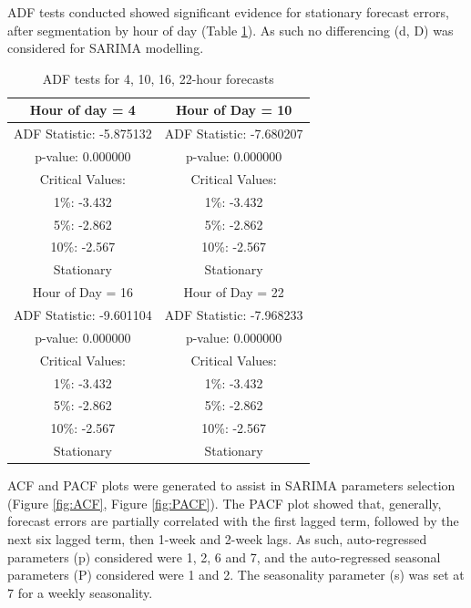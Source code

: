 \documentclass[mstat,12pt]{unswthesis}
\begin{document}
ADF tests conducted showed significant evidence for stationary forecast errors, after segmentation by hour of day (Table \ref{tab:tab6}). As such no differencing (d, D) was considered for SARIMA modelling.

\begin{table}[H]
\caption{ADF tests for 4, 10, 16, 22-hour forecasts}
\centering
\begin{tabular}{||c||c||}
\hline
Hour of day = 4 & Hour of Day = 10 \\
\hline
ADF Statistic: -5.875132 & ADF Statistic: -7.680207 \\
p-value: 0.000000 & p-value: 0.000000 \\
Critical Values: & Critical Values: \\
 1\%: -3.432  &  1\%: -3.432 \\
 5\%: -2.862 &   5\%: -2.862 \\
 10\%: -2.567 &  10\%: -2.567 \\
Stationary & Stationary \\
\hline
\hline
Hour of Day = 16 & Hour of Day = 22 \\
\hline
ADF Statistic: -9.601104 & ADF Statistic: -7.968233 \\
p-value: 0.000000 & p-value: 0.000000 \\
Critical Values: & Critical Values: \\
 1\%: -3.432 &  1\%: -3.432 \\
 5\%: -2.862 &  5\%: -2.862 \\
 10\%: -2.567 &  10\%: -2.567 \\
Stationary & Stationary \\
\hline
\end{tabular}
\label{tab:tab6}
\end{table}

\bigskip

ACF and PACF plots were generated to assist in SARIMA parameters selection (Figure \ref{fig:ACF}, Figure \ref{fig:PACF}). The PACF plot showed that, generally, forecast errors are partially correlated with the first lagged term, followed by the next six lagged term, then 1-week and 2-week lags. As such, auto-regressed parameters (p) considered were 1, 2, 6 and 7, and the auto-regressed seasonal parameters (P) considered were 1 and 2. The seasonality parameter (s) was set at 7 for a weekly seasonality.
\end{document}

